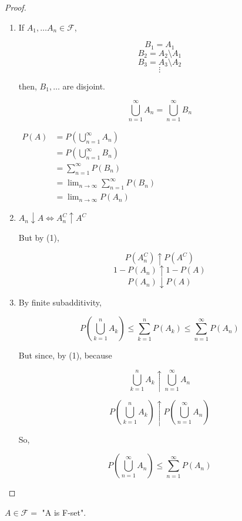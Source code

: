 \documentclass[11pt,fleqn]{book} %
\begin{document}
 \begin{proof}

 \begin{enumerate}
 	\item If $A_1, \dots A_n \in \mathcal{F}$,

		$$B_1 = A_1 $$
		$$B_2 = A_2 \setminus A_1$$
		$$B_3 = A_3 \setminus A_2$$
		$$\vdots $$

		then, $B_1, \dots$ are disjoint. 

		$$\displaystyle \bigcup^\infty_{n=1} A_n = \displaystyle \bigcup^\infty_{n=1} B_n $$

		$\begin{aligned}
			P(A) &= P(\displaystyle \bigcup^\infty_{n=1} A_n) \\
		&= P(\displaystyle \bigcup^\infty_{n=1} B_n ) \\
		&= \displaystyle \sum^\infty_{n=1} P(B_n) \\
		&= \lim_{n \rightarrow \infty} \displaystyle \sum^\infty_{n=1} P(B_n)\\ 
		&= \lim_{n \rightarrow \infty} P(A_n)
		\end{aligned}
		$

	\item $A_n \downarrow A \Leftrightarrow A_n^C \uparrow A^C$

	But by (1), 

	$$P(A_n^C) \uparrow P(A^C)$$
	$$1 - P(A_n) \uparrow 1 - P(A)$$
	$$P(A_n) \downarrow P(A)$$


	\item By finite subadditivity, 

	$$ P(\displaystyle \bigcup^n_{k=1} A_k) \leq \displaystyle \sum^n_{k=1} P(A_k) \leq \displaystyle \sum^\infty_{n=1} P(A_n)$$

	But since, by (1), because

	$$\displaystyle \bigcup^n_{k=1} A_k \uparrow \displaystyle \bigcup^\infty_{n=1} A_n$$

	$$P(\displaystyle \bigcup^n_{k=1} A_k) \uparrow P(\displaystyle \bigcup^\infty_{n=1} A_n)$$

	So, 

	$$P(\displaystyle \bigcup^\infty_{n=1} A_n) \leq
		 \displaystyle \sum^\infty_{n=1} P(A_n)$$


 \end{enumerate}
\end{proof}

\begin{remark}
	$A \in \mathcal{F} =$ "A is F-set".
\end{remark}
\end{document}
